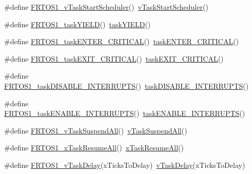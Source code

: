 \begin{DoxyCompactItemize}
\item 
\#define \hyperlink{group___f_r_t_o_s1__module_gaf792f2c8cca61f076134b057f6029677}{F\+R\+T\+O\+S1\+\_\+v\+Task\+Start\+Scheduler}()~\hyperlink{tasks_8c_a598661cdd2a6af95a077245d11e3d142}{v\+Task\+Start\+Scheduler}()
\item 
\#define \hyperlink{group___f_r_t_o_s1__module_gae5068fcbc0ac5513a978a8ba03ef53e3}{F\+R\+T\+O\+S1\+\_\+task\+Y\+I\+E\+LD}()~\hyperlink{task_8h_a767e474430db1e60056e9678763f9202}{task\+Y\+I\+E\+LD}()
\item 
\#define \hyperlink{group___f_r_t_o_s1__module_gaddc0c0064f175a3c83b24c83caf32128}{F\+R\+T\+O\+S1\+\_\+task\+E\+N\+T\+E\+R\+\_\+\+C\+R\+I\+T\+I\+C\+AL}()~\hyperlink{task_8h_ab7bf0ae866292ba8296091a9d5209689}{task\+E\+N\+T\+E\+R\+\_\+\+C\+R\+I\+T\+I\+C\+AL}()
\item 
\#define \hyperlink{group___f_r_t_o_s1__module_ga1f3d51d9c8451ecf09eae1c5c816c54f}{F\+R\+T\+O\+S1\+\_\+task\+E\+X\+I\+T\+\_\+\+C\+R\+I\+T\+I\+C\+AL}()~\hyperlink{task_8h_aac8f36abc45ac4ee714bd6b81e3b1643}{task\+E\+X\+I\+T\+\_\+\+C\+R\+I\+T\+I\+C\+AL}()
\item 
\#define \hyperlink{group___f_r_t_o_s1__module_ga89a659441dfc2c89b84234f8c3c205c7}{F\+R\+T\+O\+S1\+\_\+task\+D\+I\+S\+A\+B\+L\+E\+\_\+\+I\+N\+T\+E\+R\+R\+U\+P\+TS}()~\hyperlink{task_8h_aa455a648c2224964ee57758b8794198e}{task\+D\+I\+S\+A\+B\+L\+E\+\_\+\+I\+N\+T\+E\+R\+R\+U\+P\+TS}()
\item 
\#define \hyperlink{group___f_r_t_o_s1__module_ga0c37f432c9538a279a6813a430a017aa}{F\+R\+T\+O\+S1\+\_\+task\+E\+N\+A\+B\+L\+E\+\_\+\+I\+N\+T\+E\+R\+R\+U\+P\+TS}()~\hyperlink{task_8h_a04361ba499e91eb35324e4cba6feea17}{task\+E\+N\+A\+B\+L\+E\+\_\+\+I\+N\+T\+E\+R\+R\+U\+P\+TS}()
\item 
\#define \hyperlink{group___f_r_t_o_s1__module_ga473cb2c53465e4f4e41c98c28cadcbce}{F\+R\+T\+O\+S1\+\_\+v\+Task\+Suspend\+All}()~\hyperlink{tasks_8c_a084d232640bd1d04bcac0b8784417015}{v\+Task\+Suspend\+All}()
\item 
\#define \hyperlink{group___f_r_t_o_s1__module_ga0b808ab2b4a42ef92dc5b7df25094b13}{F\+R\+T\+O\+S1\+\_\+x\+Task\+Resume\+All}()~\hyperlink{tasks_8c_adf830ea0f150fcdfdaa944667137f080}{x\+Task\+Resume\+All}()
\item 
\#define \hyperlink{group___f_r_t_o_s1__module_ga31e207c0eb1a496de7069e8ba6573287}{F\+R\+T\+O\+S1\+\_\+v\+Task\+Delay}(x\+Ticks\+To\+Delay)~\hyperlink{tasks_8c_a9917b05abb77e75e959151ae67065dce}{v\+Task\+Delay}(x\+Ticks\+To\+Delay)
\item 

\end{DoxyCompactItemize}
